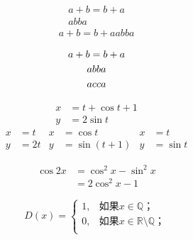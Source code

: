 \documentclass{ctexart}
\begin{document}
	
	\begin{gather}
		a + b = b + a \\
		ab ba
	\end{gather}
	\begin{gather*}
		a + b = b + a
		ab ba
	\end{gather*}

	\begin{gather}
		a + b = b + a \notag \\ 
		ab ba \notag \\
		ac ca
	\end{gather}
	
	\begin{align}
	x &= t + \cos t + 1 \\
	y &= 2\sin t
	\end{align}
	\begin{align*}
	x &= t & x &= \cos t & x &= t \\
	y &= 2t & y &= \sin(t+1) & y &= \sin t
	\end{align*}

	\begin{equation}
	\begin{split}
	\cos 2x &= \cos^2 x - \sin^2 x \\
	&= 2\cos^2 x - 1
	\end{split}
	\end{equation}
	
	\begin{equation}
	D(x) = \begin{cases}
	1, & \text{如果} x \in \mathbb{Q}；\\
	0, & \text{如果} x \in \mathbb{R}\setminus\mathbb{Q}；\\
	\end{cases}
	\end{equation}
\end{document}
